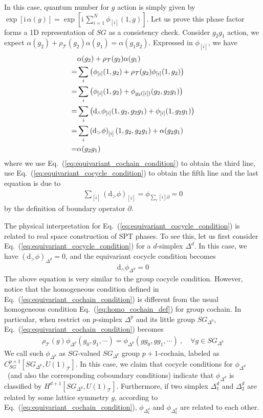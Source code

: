 \documentclass[reprint,amsmath,amssymb,aps,pra,]{revtex4-1}
\newcommand{\dd}{\mathrm{d}} %
\newcommand{\ii}{\mathrm{i}\,} %
\newcommand{\TT}{\mathcal{T}} %
\begin{document}
  In this case, quantum number for $g$ action is simply given by $\exp[\ii\alpha(g)]=\exp\left[\ii\sum_{i=1}^N \phi_{[i]}(1,g)\right]$.
 Let us prove this phase factor forms a 1D representation of $SG$ as a consistency check.
  Consider $g_2g_1$ action, we expect $\alpha(g_2)+\rho_\TT(g_2)\alpha(g_1)=\alpha(g_1g_2)$.
  Expressed in $\phi_{[i]}$, we have
  \begin{align}
    &\alpha(g_2)+\rho_\TT(g_2)\alpha(g_1)\notag\\
    =&\sum_i\left(\phi_{[i]}(1,g_2)+\rho_\TT(g_2)\phi_{[i]}(1,g_2)\right)\notag\\
    =&\sum_i\left( \phi_{[i]}(1,g_2)+\phi_{g_2([i])}(g_2,g_2g_1) \right)\notag\\
    =&\sum_i\left( \dd_\wedge\phi_{[i]}(1,g_2,g_2g_1)+\phi_{[i]}(1,g_2g_1) \right)\notag\\
    =&\sum_i\left( \dd_>\phi \right)_{[i]}(1,g_2,g_2g_1)+\alpha(g_2g_1)\notag\\
    =&\alpha(g_2g_1)
    \label{}
  \end{align}
  where we use Eq.~(\ref{eq:equivariant_cochain_condition}) to obtain the third line, use Eq.~(\ref{eq:equivariant_cocycle_condition}) to obtain the fifth line and the last equation is due to 
  \begin{align}
    \sum_{[i]}(\dd_>\phi)_{[i]}=\phi_{\sum_i[i]\partial}=0
    \label{}
  \end{align}
  by the definition of boundary operator $\partial$.

The physical interpretation for Eq.~(\ref{eq:equivariant_cocycle_condition}) is related to real space construction of SPT phases.
To see this, let us first consider Eq.~(\ref{eq:equivariant_cocycle_condition}) for a $d$-simplex $\Delta^d$.
In this case, we have $(\dd_>\phi)_{\Delta^d}=0$, and the equivariant cocycle condition becomes
\begin{align}
  \dd_\wedge\phi_{\Delta^d}=0
  \label{eq:equivariant_cocycle_d_simplex}
\end{align}
The above equation is very similar to the group cocycle condition. 
However, notice that the homogeneous condition defined in Eq.~(\ref{eq:equivariant_cochain_condition}) is different from the usual homogeneous condition Eq.~(\ref{eq:homo_cochain_def}) for group cochain.
In particular, when restrict on $p$-simplex $\Delta^p$ and its little group $SG_{\Delta^p}$, Eq.~(\ref{eq:equivariant_cochain_condition}) becomes
\begin{align}
  \rho_{\TT}(g)\phi_{\Delta^p}(g_0,g_1,\cdots)= \phi_{\Delta^p}(gg_0,gg_1,\cdots)~,\quad\forall g\in SG_{\Delta^p}
  \label{eq:SG-valued_SG_delta_cochain}
\end{align}
We call such $\phi_{\Delta^p}$ as $SG$-valued $SG_{\Delta^p}$ group $p+1$-cochain, labeled as $C_{SG}^{p+1}[SG_{\Delta^p},U(1)_\TT]$.
In this case, we claim that cocycle conditions for $\phi_{\Delta^d}$~(and also the corresponding coboundary conditions) indicate that $\phi_{\Delta^d}$ is classified by $H^{d+1}[SG_{\Delta^d},U(1)_\TT]$.
Furthermore, if two simplex $\Delta^d_1$ and $\Delta^d_2$ are related by some lattice symmetry $g$, according to Eq.~(\ref{eq:equivariant_cochain_condition}), $\phi_{\Delta_1^d}$ and $\phi_{\Delta_2^d}$ are related to each other.
\end{document}
